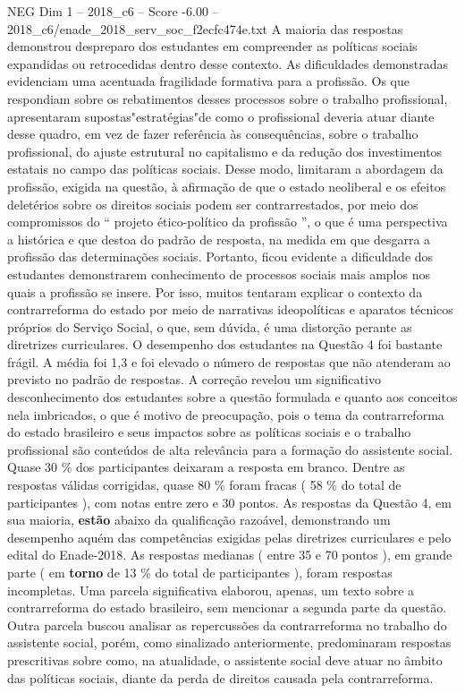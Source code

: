 \begin{textsample}{NEG Dim 1 – 2018\_c6 – Score -6.00 – 2018\_c6/enade\_2018\_serv\_soc\_f2ecfc474e.txt}
A maioria das respostas demonstrou despreparo dos estudantes em compreender as políticas sociais expandidas ou retrocedidas dentro desse contexto.
As dificuldades demonstradas evidenciam uma acentuada fragilidade formativa para a profissão.
Os que respondiam sobre os rebatimentos desses processos sobre o trabalho profissional, apresentaram supostas"estratégias"de como o profissional deveria atuar diante desse quadro, em vez de fazer referência às consequências, sobre o trabalho profissional, do ajuste estrutural no capitalismo e da redução dos investimentos estatais no campo das políticas sociais.
Desse modo, limitaram a abordagem da profissão, exigida na questão, à afirmação de que o estado neoliberal e os efeitos deletérios sobre os direitos sociais podem ser contrarrestados, por meio dos compromissos do “ projeto ético-político da profissão ”, o que é uma perspectiva a histórica e que destoa do padrão de resposta, na medida em que desgarra a profissão das determinações sociais.
Portanto, ficou evidente a dificuldade dos estudantes demonstrarem conhecimento de processos sociais mais amplos nos quais a profissão se insere.
Por isso, muitos tentaram explicar o contexto da contrarreforma do estado por meio de narrativas ideopolíticas e aparatos técnicos próprios do Serviço Social, o que, sem dúvida, é uma distorção perante as diretrizes curriculares.
O desempenho dos estudantes na Questão 4 foi bastante frágil.
A média foi 1,3 e foi elevado o número de respostas que não atenderam ao previsto no padrão de respostas.
A correção revelou um significativo desconhecimento dos estudantes sobre a questão formulada e quanto aos conceitos nela imbricados, o que é motivo de preocupação, pois o tema da contrarreforma do estado brasileiro e seus impactos sobre as políticas sociais e o trabalho profissional são conteúdos de alta relevância para a formação do assistente social.
Quase 30 \% dos participantes deixaram a resposta em branco.
Dentre as respostas válidas corrigidas, quase 80 \% foram fracas ( 58 \% do total de participantes ), com notas entre zero e 30 pontos.
As respostas da Questão 4, em sua maioria, \textbf{estão} abaixo da qualificação razoável, demonstrando um desempenho aquém das competências exigidas pelas diretrizes curriculares e pelo edital do Enade-2018.
As respostas medianas ( entre 35 e 70 pontos ), em grande parte ( em \textbf{torno} de 13 \% do total de participantes ), foram respostas incompletas.
Uma parcela significativa elaborou, apenas, um texto sobre a contrarreforma do estado brasileiro, sem mencionar a segunda parte da questão.
Outra parcela buscou analisar as repercussões da contrarreforma no trabalho do assistente social, porém, como sinalizado anteriormente, predominaram respostas prescritivas sobre como, na atualidade, o assistente social deve atuar no âmbito das políticas sociais, diante da perda de direitos causada pela contrarreforma.

\end{textsample}
